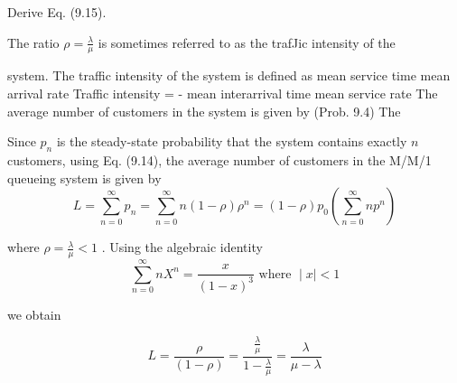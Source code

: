 \documentclass[a4paper12pt]{article}
\begin{document}
\large 






Derive Eq. (9.15). 

 The ratio ${\rho = \frac{\lambda}{\mu}}$ is sometimes referred to as the trafJic intensity of the 

system. The traffic intensity of the system is defined as 
mean service time mean arrival rate Traffic intensity = - mean interarrival time mean service rate 
The average number of customers in the system is given by (Prob. 9.4) 
The

\newpage 

Since $p_n$ is the steady-state probability that the system contains exactly $n$ customers, using Eq. (9.14), 
the average number of customers in the M/M/1 queueing system is given by \[ L = \sum^{\infty}_{n=0}p_{n} =\sum^{\infty}_{n=0} n(1-\rho) \rho^{n} = (1-\rho) p_{0}\left(\sum^{\infty}_{n=0}np^{n}\right)  \]

where ${\rho = \frac{\lambda}{\mu} < 1}$ . Using the algebraic identity 
\[\sum^{\infty}_{n=0}nX^{n} = \frac{x}{(1-x)^3} \mbox{ where } \mid x \mid < 1 \]

we obtain 

\[L =  \frac{\rho}{(1-\rho)} = \frac{\frac{\lambda}{\mu}}{1- \frac{\lambda}{\mu} } = \frac{\lambda}{\mu-\lambda}\]
\end{document}
